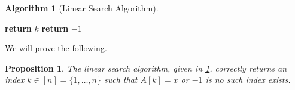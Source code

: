 \documentclass{article}
\theoremstyle{plain}
\newtheorem{proposition}[theorem]{Proposition}
\theoremstyle{definition}
\newtheorem{algorithm}[theorem]{Algorithm}
\begin{document}
\begin{algorithm}[Linear Search Algorithm] \phantom{}\label{alg_lsearch}
\begin{center}
\begin{minipage}{.5\linewidth}
\begin{algorithmic}[1]
                \State \textbf{return} \(k\)
            \EndIf
        \EndFor
        \State \textbf{return} \(-1\)
    \EndProcedure
\end{algorithmic}
\end{minipage}
\end{center}
\end{algorithm}

We will prove the following.

\begin{proposition}\label{prop_correct_lsearch}
    The linear search algorithm, given in \cref{alg_lsearch}, correctly returns an index \(k \in [n] = \{1,\dotsc,n\}\) such that \(A[k] = x\) or \(-1\) is no such index exists. 
\end{proposition}
\end{document}
